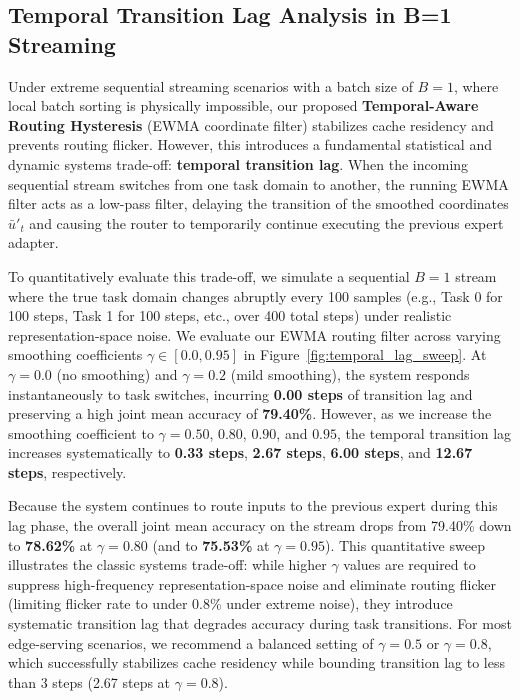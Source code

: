\subsection{Temporal Transition Lag Analysis in B=1 Streaming}
\label{sec:temporal_lag}
Under extreme sequential streaming scenarios with a batch size of $B=1$, where local batch sorting is physically impossible, our proposed \textbf{Temporal-Aware Routing Hysteresis} (EWMA coordinate filter) stabilizes cache residency and prevents routing flicker. However, this introduces a fundamental statistical and dynamic systems trade-off: \textbf{temporal transition lag}. When the incoming sequential stream switches from one task domain to another, the running EWMA filter acts as a low-pass filter, delaying the transition of the smoothed coordinates $\bar{u}'_t$ and causing the router to temporarily continue executing the previous expert adapter.

To quantitatively evaluate this trade-off, we simulate a sequential $B=1$ stream where the true task domain changes abruptly every 100 samples (e.g., Task 0 for 100 steps, Task 1 for 100 steps, etc., over 400 total steps) under realistic representation-space noise. We evaluate our EWMA routing filter across varying smoothing coefficients $\gamma \in [0.0, 0.95]$ in Figure~\ref{fig:temporal_lag_sweep}. At $\gamma = 0.0$ (no smoothing) and $\gamma = 0.2$ (mild smoothing), the system responds instantaneously to task switches, incurring \textbf{0.00 steps} of transition lag and preserving a high joint mean accuracy of \textbf{79.40\%}. However, as we increase the smoothing coefficient to $\gamma = 0.50$, $0.80$, $0.90$, and $0.95$, the temporal transition lag increases systematically to \textbf{0.33 steps}, \textbf{2.67 steps}, \textbf{6.00 steps}, and \textbf{12.67 steps}, respectively. 

Because the system continues to route inputs to the previous expert during this lag phase, the overall joint mean accuracy on the stream drops from 79.40\% down to \textbf{78.62\%} at $\gamma=0.80$ (and to \textbf{75.53\%} at $\gamma=0.95$). This quantitative sweep illustrates the classic systems trade-off: while higher $\gamma$ values are required to suppress high-frequency representation-space noise and eliminate routing flicker (limiting flicker rate to under 0.8\% under extreme noise), they introduce systematic transition lag that degrades accuracy during task transitions. For most edge-serving scenarios, we recommend a balanced setting of $\gamma = 0.5$ or $\gamma = 0.8$, which successfully stabilizes cache residency while bounding transition lag to less than 3 steps (2.67 steps at $\gamma = 0.8$).

